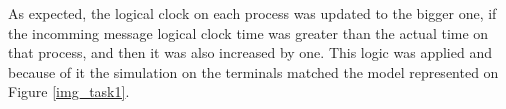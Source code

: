 \documentclass[a4paper, 11pt]{article}
\begin{document}
As expected, the logical clock on each process was updated to the bigger one, if the incomming message logical clock time was greater than the actual time on that process, and then it was also increased by one. This logic was applied and because of it the simulation on the terminals matched the model represented on Figure \ref{img_task1}.


% 
% 
\end{document}
